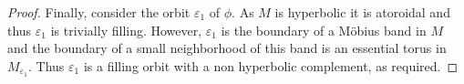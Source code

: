\documentclass[12pt]{amsart}
\theoremstyle{definition}
\theoremstyle{remark}
\begin{document}
\begin{proof}
Finally, consider the orbit $\varepsilon_1$ of $\phi$. As $M$ is hyperbolic it is atoroidal and thus $\varepsilon_1$ is trivially filling. However, $\varepsilon_1$ is the boundary of a M\"obius band in $M$ and the boundary of a small neighborhood of this band is an essential torus in $M_{\varepsilon_1}$. Thus $\varepsilon_1$ is a filling orbit with a non hyperbolic complement, as required.
\end{proof}






\end{document}

